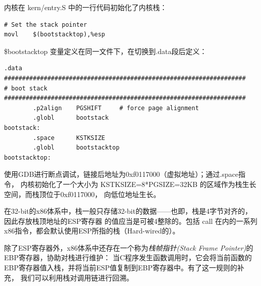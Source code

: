 \documentclass[12pt, letterpaper]{report}
\begin{document}
内核在 kern/entry.S 中的一行代码初始化了内核栈：
\lstset{style=AssemblyStyle}
\setmainfont{Consolas}
\begin{lstlisting}
# Set the stack pointer
movl	$(bootstacktop),%esp
\end{lstlisting}
\setmainfont{Times New Roman}
\$bootstacktop 变量定义在同一文件下，在切换到.data段后定义：
\lstset{style=AssemblyStyle}
\setmainfont{Consolas}
\begin{lstlisting}
.data
###################################################################
# boot stack
###################################################################
        .p2align	PGSHIFT		# force page alignment
        .globl		bootstack
bootstack:
        .space		KSTKSIZE
        .globl		bootstacktop   
bootstacktop:

\end{lstlisting}
\setmainfont{Times New Roman}
使用GDB进行断点调试，链接后地址为0xf0117000（虚拟地址）；通过.space指令，
内核初始化了一个大小为 KSTKSIZE=8*PGSIZE=32KB 的区域作为栈生长空间，而栈顶位于0xf0117000，
向低位地址生长。
\quad \par 

在32-bit的x86体系中，栈一般只存储32-bit的数据——也即，栈是4字节对齐的，因此存放栈顶地址的ESP寄存器
的值应当是可被4整除的。包括 call 在内的一系列x86指令，都会默认使用ESP所指的栈（Hard-wired的）。\par 
除了ESP寄存器外，x86体系中还存在一个称为\textsl{栈帧指针(Stack Frame Pointer)}的EBP寄存器，协助对栈进行维护：
当C程序发生函数调用时，它会将当前函数的EBP寄存器值入栈，并将当前ESP值复制到EBP寄存器中。有了这一规则的补充，
我们可以利用栈对调用链进行回溯。\par 

\end{document}

